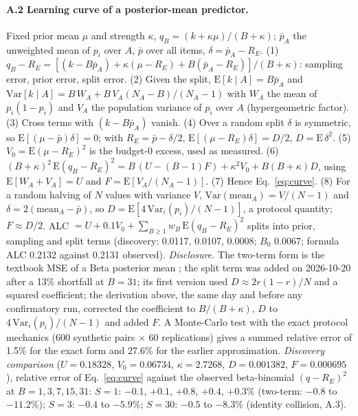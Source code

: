 \documentclass{article}
\begin{document}
\paragraph{A.2 Learning curve of a posterior-mean predictor.} Fixed prior mean $\mu$ and strength $\kappa$, $q_B = (k +
\kappa\mu)/(B+\kappa)$; $\bar p_A$ the unweighted mean of $p_i$ over $A$, $\bar p$ over all items, $\delta = \bar p_A -
R_E$.
(1) $q_B - R_E = [(k - B\bar p_A) + \kappa(\mu - R_E) + B(\bar p_A - R_E)]/(B+\kappa)$: sampling error, prior error,
split error.
(2) Given the split, $\mathrm{E}[k \mid A] = B\bar p_A$ and $\mathrm{Var}[k \mid A] = B\,W_A + B\,V_A (N_A - B)/(N_A - 1)$
with $W_A$ the mean of $p_i(1-p_i)$ and $V_A$ the population variance of $p_i$ over $A$ (hypergeometric factor).
(3) Cross terms with $(k - B\bar p_A)$ vanish.
(4) Over a random split $\delta$ is symmetric, so $\mathrm{E}[(\mu - \bar p)\delta] = 0$; with $R_E = \bar p - \delta/2$,
$\mathrm{E}[(\mu - R_E)\delta] = D/2$, $D = \mathrm{E}\,\delta^2$.
(5) $V_0 = \mathrm{E}(\mu - R_E)^2$ is the budget-0 excess, used as measured.
(6) $(B+\kappa)^2\,\mathrm{E}(q_B - R_E)^2 = B\,(U - (B-1)F) + \kappa^2 V_0 + B(B+\kappa)D$, using
$\mathrm{E}[W_A + V_A] = U$ and $F = \mathrm{E}[V_A/(N_A - 1)]$.
(7) Hence Eq.~\ref{eq:curve}.
(8) For a random halving of $N$ values with variance $V$, $\mathrm{Var}(\mathrm{mean}_A) = V/(N-1)$ and $\delta =
2(\mathrm{mean}_A - \bar p)$, so $D = \mathrm{E}[4\,\mathrm{Var}_i(p_i)/(N-1)]$, a protocol quantity; $F \approx D/2$.
ALC $= U + 0.1 V_0 + \sum_{B \ge 1} w_B\,\mathrm{E}(q_B - R_E)^2$ splits into prior, sampling and split terms
(discovery: 0.0117, 0.0107, 0.0008; $B_0$ 0.0067; formula ALC 0.2132 against 0.2131 observed).
\emph{Disclosure.} The two-term form is the textbook MSE of a Beta posterior mean \citep{morris1983peb}; the split
term was added on 2026-10-20 after a 13\% shortfall at $B = 31$; its first version used $D \approx 2r(1-r)/N$ and a
squared coefficient; the derivation above, the same day and before any confirmatory run, corrected the coefficient to
$B/(B+\kappa)$, $D$ to $4\,\mathrm{Var}_i(p_i)/(N-1)$ and added $F$. A Monte-Carlo test with the exact protocol
mechanics (600 synthetic pairs $\times$ 60 replications) gives a summed relative error of 1.5\% for the exact form and
27.6\% for the earlier approximation. \emph{Discovery comparison} ($U = 0.18328$, $V_0 = 0.06734$, $\kappa = 2.7268$,
$D = 0.001382$, $F = 0.000695$), relative error of Eq.~\ref{eq:curve} against the observed beta-binomial $(q -
R_E)^2$ at $B = 1, 3, 7, 15, 31$: $S = 1$: $-0.1$, $+0.1$, $+0.8$, $+0.4$, $+0.3\%$ (two-term: $-0.8$ to $-11.2\%$);
$S = 3$: $-0.4$ to $-5.9\%$; $S = 30$: $-0.5$ to $-8.3\%$ (identity collision, A.3).
\end{document}

